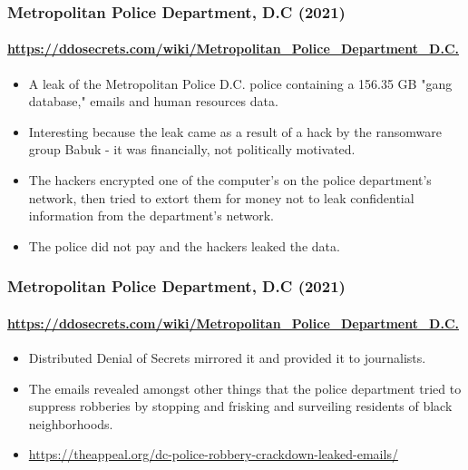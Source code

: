 \documentclass[aspectratio=169,usenames,dvipsnames]{beamer}
\begin{document}
\begin{frame}
  \frametitle{Metropolitan Police Department, D.C (2021)}
  \framesubtitle{\url{https://ddosecrets.com/wiki/Metropolitan_Police_Department_D.C.}}

  \begin{itemize}[<+->]
    \item A leak of the Metropolitan Police D.C. police containing a 156.35 GB
      "gang database," emails and human resources data.
    \item Interesting because the leak came as a result of a hack by the
      ransomware group Babuk - it was financially, not politically motivated.
    \item The hackers encrypted one of the computer's on the police
      department's network, then tried to extort them for money not to leak
      confidential information from the department's network.
    \item The police did not pay and the hackers leaked the data.
  \end{itemize}
\end{frame}

\begin{frame}
  \frametitle{Metropolitan Police Department, D.C (2021)}
  \framesubtitle{\url{https://ddosecrets.com/wiki/Metropolitan_Police_Department_D.C.}}

  \begin{itemize}[<+->]
    \item Distributed Denial of Secrets mirrored it and provided it to
      journalists.
    \item The emails revealed amongst other things that the police department
      tried to suppress robberies by stopping and frisking and surveiling
      residents of black neighborhoods.
    \item
      \url{https://theappeal.org/dc-police-robbery-crackdown-leaked-emails/}
  \end{itemize}
\end{frame}
\end{document}
